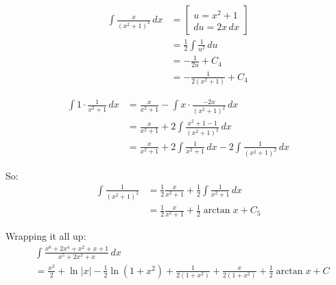 \documentclass[11pt]{article}
\begin{document}
\begin{align*}
\int \frac{x}{(x^2 + 1)^2} \, dx &= \left[ \begin{gathered} u = x^2 + 1 \\ du = 2x \, dx \end{gathered} \right] \\
&= \frac{1}{2} \int \frac{1}{u^2} \, du \\
&= - \frac{1}{2u} + C_4 \\
&= - \frac{1}{2(x^2 + 1)} + C_4
\end{align*}

\begin{align*}
\int 1 \cdot \frac{1}{x^2 + 1} \, dx &= \frac{x}{x^2 + 1} - \int x \cdot \frac{-2x}{(x^2 + 1)^2} \, dx \\
&= \frac{x}{x^2 + 1} + 2 \int \frac{x^2 + 1 - 1}{(x^2 + 1)^2} \, dx \\
&= \frac{x}{x^2 + 1} + 2 \int \frac{1}{x^2 + 1} \, dx - 2 \int \frac{1}{(x^2 + 1)^2} \, dx
\end{align*}

So:
\begin{align*}
\int \frac{1}{(x^2 + 1)^2} &= \frac{1}{2} \frac{x}{x^2 + 1} + \frac{1}{2} \int \frac{1}{x^2 + 1} \, dx \\
&= \frac{1}{2} \frac{x}{x^2 + 1} + \frac{1}{2} \arctan x + C_5
\end{align*}

Wrapping it all up:
\begin{align*}
&\int \frac{x^6 + 2x^4 + x^2 + x + 1}{x^5 + 2x^3 + x} \, dx \\
&= \frac{x^2}{2} + \ln |x| - \frac{1}{2} \ln (1 + x^2) + \frac{1}{2(1 + x^2)} + \frac{x}{2(1 + x^2)} + \frac{1}{2} \arctan x + C
\end{align*}
\end{document}
